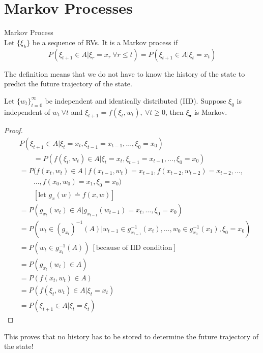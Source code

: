 \section{Markov Processes}
\begin{definition}{Markov Process} \\
Let $\{\xi_k\}$ be a sequence of RVs. It is a Markov process if
$$P(\xi_{t+1}\in A|\xi_r=x_r ~\forall r\leq t) = P(\xi_{t+1}\in A|\xi_t=x_t)$$
\end{definition}
The definition means that we do not have to know the history of the state to predict the future trajectory of the state.

\begin{theorem}
Let $\{w_t\}_{t=0}^\infty$ be independent and identically distributed (IID). Suppose $\xi_0$ is independent of $w_t ~\forall t$ and $\xi_{t+1} = f(\xi_t,w_t), ~\forall t \geq 0$, then $\xi_\bullet$ is Markov.
\end{theorem}

\begin{proof}
\begin{align*}
&P(\xi_{t+1}\in A | \xi_t=x_t, \xi_{t-1}=x_{t-1}, \ldots, \xi_0=x_0) \\
&\qquad = P(f(\xi_t,w_t)\in A|\xi_t=x_t, \xi_{t-1}=x_{t-1}, \ldots, \xi_0=x_0) \\
&= P(f(x_t,w_t)\in A ~|~ f(x_{t-1},w_t)=x_{t-1}, f(x_{t-2},w_{t-2})=x_{t-2},\ldots, \\
&\qquad \ldots,f(x_0,w_0)=x_1,\xi_0=x_0) \\
&\qquad [\text{let }g_x(w) \doteq f(x,w)] \\
&= P(g_{x_t}(w_t)\in A|g_{x_{t-1}}(w_{t-1})=x_t,\dots,\xi_0=x_0) \\
&= P(w_t\in(g_{x_t})^{-1}(A)|w_{t-1}\in g_{x_{t-1}}^{-1}(x_t),\ldots, w_0\in g_{x_0}^{-1}(x_1),\xi_0=x_0) \\
&= P(w_t\in g_{x_t}^{-1}(A)) ~ [\text{because of IID condition}] \\
&= P(g_{x_t}(w_t)\in A) \\
&= P(f(x_t,w_t)\in A) \\
&= P(f(\xi_t,w_t)\in A|\xi_t=x_t) \\
&= P(\xi_{t+1}\in A|\xi_t=\xi_t)
\end{align*}
\end{proof}
This proves that no history has to be stored to determine the future trajectory of the state!

